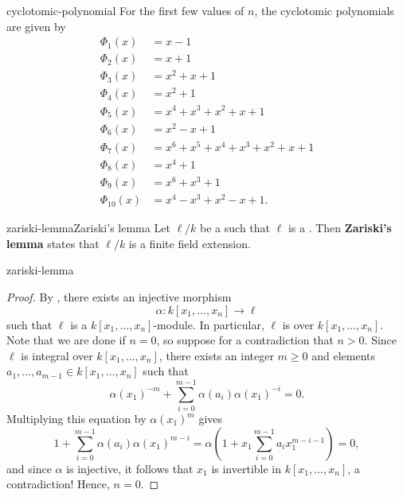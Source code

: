 \begin{example}{cyclotomic-polynomial}
    For the first few values of $n$, the cyclotomic polynomials are given by
    \[ \begin{aligned}
        \Phi_1(x) &= x - 1 \\
        \Phi_2(x) &= x + 1 \\
        \Phi_3(x) &= x^2 + x + 1 \\
        \Phi_4(x) &= x^2 + 1 \\
        \Phi_5(x) &= x^4 + x^3 + x^2 + x + 1 \\
        \Phi_6(x) &= x^2 - x + 1 \\
        \Phi_7(x) &= x^6 + x^5 + x^4 + x^3 + x^2 + x + 1 \\
        \Phi_8(x) &= x^4 + 1 \\
        \Phi_9(x) &= x^6 + x^3 + 1 \\
        \Phi_{10}(x) &= x^4 - x^3 + x^2 - x + 1 .
    \end{aligned} \]
\end{example}

\begin{topic}{zariski-lemma}{Zariski's lemma}
    Let $\ell/k$ be a  such that $\ell$ is a . Then \textbf{Zariski's lemma} states that $\ell/k$ is a finite field extension.
\end{topic}

\begin{example}{zariski-lemma}
    \begin{proof}
        By , there exists an injective morphism
        \[ \alpha : k[x_1, \ldots, x_n] \to \ell \]
        such that $\ell$ is a  $k[x_1, \ldots, x_n]$-module. In particular, $\ell$ is  over $k[x_1, \ldots, x_n]$. Note that we are done if $n = 0$, so suppose for a contradiction that $n > 0$.
        Since $\ell$ is integral over $k[x_1, \ldots, x_n]$, there exists an integer $m \ge 0$ and elements $a_1, \ldots, a_{m - 1} \in k[x_1, \ldots, x_n]$ such that
        \[ \alpha(x_1)^{-m} + \sum_{i = 0}^{m - 1} \alpha(a_i) \alpha(x_1)^{-i} = 0 . \]
        Multiplying this equation by $\alpha(x_1)^m$ gives
        \[ 1 + \sum_{i = 0}^{m - 1} \alpha(a_i) \alpha(x_1)^{m - i} = \alpha\left(1 + x_1 \sum_{i = 0}^{m - 1} a_i x_1^{m - i - 1} \right) = 0 , \]
        and since $\alpha$ is injective, it follows that $x_1$ is invertible in $k[x_1, \ldots, x_n]$, a contradiction! Hence, $n = 0$.
    \end{proof}
\end{example}

